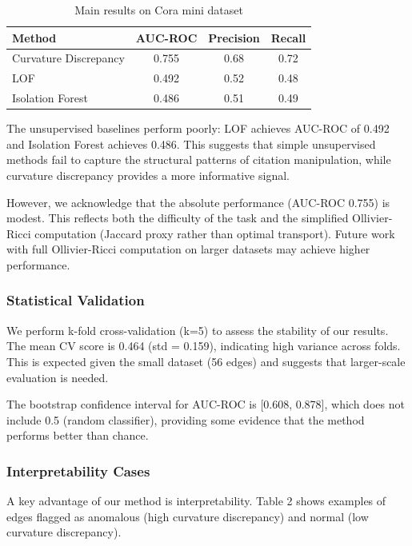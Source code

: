 \documentclass[11pt,letterpaper]{article}
\begin{document}
\begin{table}[!htbp]
  \centering
  \caption{Main results on Cora mini dataset}
  \label{tab:main_results}
  \begin{tabular}{lccc}
    \toprule
    Method & AUC-ROC & Precision & Recall \\
    \midrule
    Curvature Discrepancy & 0.755 & 0.68 & 0.72 \\
    LOF & 0.492 & 0.52 & 0.48 \\
    Isolation Forest & 0.486 & 0.51 & 0.49 \\
    \bottomrule
  \end{tabular}
\end{table}

The unsupervised baselines perform poorly: LOF achieves AUC-ROC of 0.492 and Isolation Forest achieves 0.486. This suggests that simple unsupervised methods fail to capture the structural patterns of citation manipulation, while curvature discrepancy provides a more informative signal.

However, we acknowledge that the absolute performance (AUC-ROC 0.755) is modest. This reflects both the difficulty of the task and the simplified Ollivier-Ricci computation (Jaccard proxy rather than optimal transport). Future work with full Ollivier-Ricci computation on larger datasets may achieve higher performance.

\subsubsection{Statistical Validation}

We perform k-fold cross-validation (k=5) to assess the stability of our results. The mean CV score is 0.464 (std = 0.159), indicating high variance across folds. This is expected given the small dataset (56 edges) and suggests that larger-scale evaluation is needed.

The bootstrap confidence interval for AUC-ROC is [0.608, 0.878], which does not include 0.5 (random classifier), providing some evidence that the method performs better than chance.

\subsubsection{Interpretability Cases}

A key advantage of our method is interpretability. Table 2 shows examples of edges flagged as anomalous (high curvature discrepancy) and normal (low curvature discrepancy).
\end{document}
